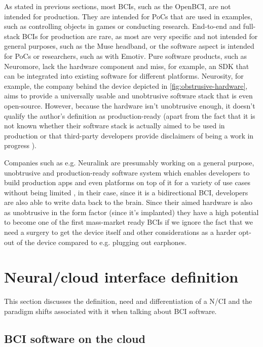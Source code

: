 As stated in previous sections, most BCIs, such as the OpenBCI, are not intended for production. They are intended for PoCs that are used in examples, such as controlling objects in games or conducting research. End-to-end and full-stack BCIs for production are rare, as most are very specific and not intended for general purposes, such as the Muse headband, or the software aspect is intended for PoCs or researchers, such as with Emotiv. Pure software products, such as Neuromore, lack the hardware component and miss, for example, an SDK that can be integrated into existing software for different platforms. Neurosity, for example, the company behind the device depicted in \autoref{fig:obstrusive-hardware}, aims to provide a universally usable and unobtrusive software stack that is even open-source. However, because the hardware isn't unobtrusive enough, it doesn't qualify the author's definition as production-ready (apart from the fact that it is not known whether their software stack is actually aimed to be used in production \citep{neurosity_neurosity_2022} or that third-party developers provide disclaimers of being a work in progress \citep{turney_notion_2022}).

\newpage

Companies such as e.g. Neuralink are presumably working on a general purpose, unobtrusive and production-ready software system which enables developers to build production apps and even platforms on top of it for a variety of use cases without being limited \citep{musk_integrated_2019}, in their case, since it is a bidirectional BCI, developers are also able to write data back to the brain. Since their aimed hardware is also as unobtrusive in the form factor (since it's implanted) they have a high potential to become one of the first mass-market ready BCIs if we ignore the fact that we need a surgery to get the device itself \citep{neuralink_approach_nodate} and other considerations as a harder opt-out of the device compared to e.g. plugging out earphones.

\section{Neural/cloud interface definition}
\label{chapter2-neural-cloud-interface-definition}

This section discusses the definition, need and differentiation of a N/CI and the paradigm shifts associated with it when talking about BCI software.

\subsection{BCI software on the cloud}
\label{chapter2-bci-software-on-the-cloud}

